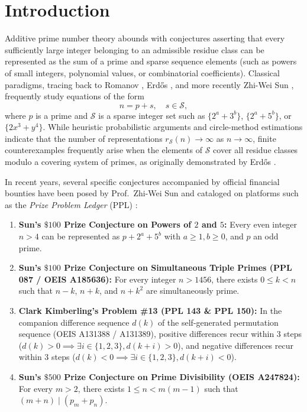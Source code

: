 \documentclass[11pt,a4paper]{article}
\theoremstyle{definition}
\theoremstyle{remark}
\begin{document}
\section{Introduction}
Additive prime number theory abounds with conjectures asserting that every sufficiently large integer belonging to an admissible residue class can be represented as the sum of a prime and sparse sequence elements (such as powers of small integers, polynomial values, or combinatorial coefficients). Classical paradigms, tracing back to Romanov \cite{romanov1934}, Erd\H{o}s \cite{erdos1950}, and more recently Zhi-Wei Sun \cite{sun2008, sun2011, sun2017}, frequently study equations of the form
\begin{equation}
n = p + s, \quad s \in \mathcal{S},
\end{equation}
where $p$ is a prime and $\mathcal{S}$ is a sparse integer set such as $\{2^a + 3^b\}$, $\{2^a + 5^b\}$, or $\{2x^3 + y^4\}$. While heuristic probabilistic arguments and circle-method estimations indicate that the number of representations $r_{\mathcal{S}}(n) \to \infty$ as $n \to \infty$, finite counterexamples frequently arise when the elements of $\mathcal{S}$ cover all residue classes modulo a covering system of primes, as originally demonstrated by Erd\H{o}s \cite{erdos1950}.

In recent years, several specific conjectures accompanied by official financial bounties have been posed by Prof.\ Zhi-Wei Sun and cataloged on platforms such as the \textit{Prize Problem Ledger} (PPL) \cite{ppl2025}:
\begin{enumerate}
    \item \textbf{Sun's $\$100$ Prize Conjecture on Powers of $2$ and $5$:} Every even integer $n > 4$ can be represented as $p + 2^a + 5^b$ with $a \ge 1, b \ge 0$, and $p$ an odd prime.
    \item \textbf{Sun's $\$100$ Prize Conjecture on Simultaneous Triple Primes (PPL 087 / OEIS A185636):} For every integer $n > 1456$, there exists $0 \le k < n$ such that $n - k$, $n + k$, and $n + k^2$ are simultaneously prime.
    \item \textbf{Clark Kimberling's Problem \#13 (PPL 143 \& PPL 150):} In the companion difference sequence $d(k)$ of the self-generated permutation sequence (OEIS A131388 / A131389), positive differences recur within 3 steps ($d(k) > 0 \implies \exists i \in \{1,2,3\}, d(k+i) > 0$), and negative differences recur within 3 steps ($d(k) < 0 \implies \exists i \in \{1,2,3\}, d(k+i) < 0$).
    \item \textbf{Sun's $\$500$ Prize Conjecture on Prime Divisibility (OEIS A247824):} For every $m > 2$, there exists $1 \le n < m(m-1)$ such that $(m + n) \mid (p_m + p_n)$.
\end{enumerate}
\end{document}
